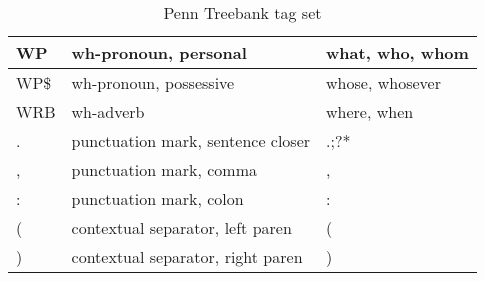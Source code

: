 \begin{table}[]
{\begin{tabular}{|l|l|l|}
            WP           & wh-pronoun, personal                      & what, who, whom            \\ \hline
            WP\$         & wh-pronoun, possessive                    & whose, whosever            \\ \hline
            WRB          & wh-adverb                                 & where, when                \\ \hline
            .            & punctuation mark, sentence closer         & .;?*                       \\ \hline
            ,            & punctuation mark, comma                   & ,                          \\ \hline
            :            & punctuation mark, colon                   & :                          \\ \hline
            (            & contextual separator, left paren          & (                          \\ \hline
            )            & contextual separator, right paren         & )                          \\ \hline
        \end{tabular}%
    }
    \caption{Penn Treebank tag set}
    \label{tab:penntagset}
\end{table}
